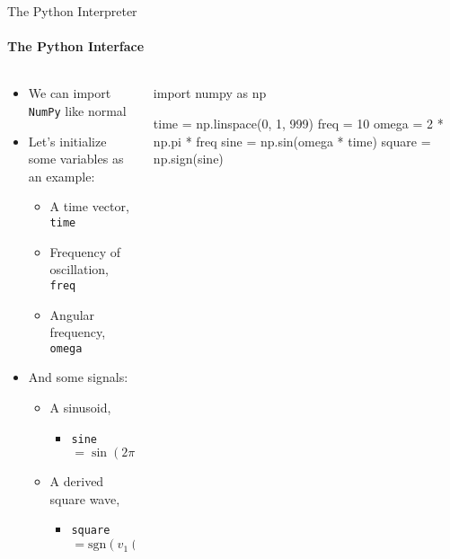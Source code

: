 \documentclass[aspectratio=1609]{presentation}
\begin{document}
\begin{frame}[fragile]{The Python Interpreter}
  \framesubtitle{The Python Interface}
  \begin{columns}
    \begin{column}{0.4\textwidth}
      \begin{itemize}
        \item We can import \texttt{NumPy} like normal
        \item Let's initialize some variables as an example:
        \begin{itemize}
          \item A time vector, \texttt{time}
          \item Frequency of oscillation, \texttt{freq}
          \item Angular frequency, \texttt{omega}
        \end{itemize}
        \item And some signals:
        \begin{itemize}
          \item A sinusoid,
            \begin{itemize}
              \item \texttt{sine} $ = \sin\left(2\pi f t\right)$
            \end{itemize}
          \item A derived square wave,
            \begin{itemize}
              \item \texttt{square} $ = \mathrm{sgn}\left(v_1(t)\right)$
            \end{itemize}
        \end{itemize}
      \end{itemize}
    \end{column}
    \begin{column}{0.6\textwidth}
      \begin{pycode}
        import numpy as np

        time = np.linspace(0, 1, 999)
        freq = 10
        omega = 2 * np.pi * freq
        sine = np.sin(omega * time)
        square = np.sign(sine)
      \end{pycode}
      {\pytypeset}
    \end{column}
  \end{columns}
\end{frame}
\end{document}
